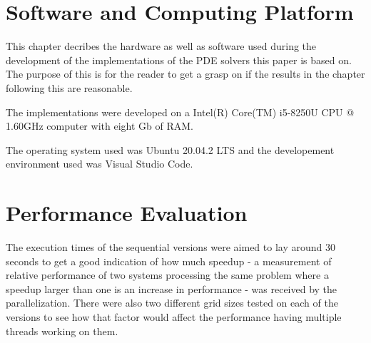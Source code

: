 \documentclass{article}
\begin{document}
\section{Software and Computing Platform}

This chapter decribes the hardware as well as software used during the development of the implementations of the PDE solvers this paper is based on. The purpose of this is for the reader to get a grasp on if the results in the chapter following this are reasonable.

The implementations were developed on a Intel(R) Core(TM) i5-8250U CPU @ 1.60GHz computer with eight Gb of RAM. 

The operating system used was Ubuntu 20.04.2 LTS and the developement environment used was Visual Studio Code.


\section{Performance Evaluation}\label{performanceevaluation}


The execution times of the sequential versions were aimed to lay around 30 seconds to get a good indication of how much speedup - a measurement of relative performance of two systems processing the same problem where a speedup larger than one is an increase in performance - was received by the parallelization. There were also two different grid sizes tested on each of the versions to see how that factor would affect the performance having multiple threads working on them. 
\end{document}
